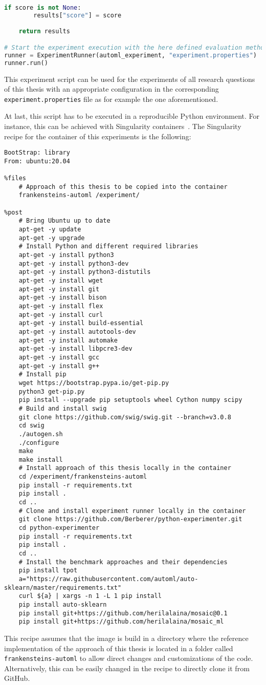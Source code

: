 \begin{lstlisting}[language=Python,basicstyle=\scriptsize]
    if score is not None:
        results["score"] = score

    return results

# Start the experiment execution with the here defined evaluation method
runner = ExperimentRunner(automl_experiment, "experiment.properties")
runner.run()
\end{lstlisting}
This experiment script can be used for the experiments of all research questions of this thesis with an appropriate configuration in the corresponding \texttt{experiment.properties} file as for example the one aforementioned.

At last, this script has to be executed in a reproducible Python environment.
For instance, this can be achieved with Singularity containers~\cite{Kurtzer-Singularity}.
The Singularity recipe for the container of this experiments is the following:
\begin{Verbatim}[fontsize=\scriptsize]
BootStrap: library
From: ubuntu:20.04

%files
    # Approach of this thesis to be copied into the container
    frankensteins-automl /experiment/

%post
    # Bring Ubuntu up to date
    apt-get -y update
    apt-get -y upgrade
    # Install Python and different required libraries
    apt-get -y install python3
    apt-get -y install python3-dev
    apt-get -y install python3-distutils
    apt-get -y install wget
    apt-get -y install git
    apt-get -y install bison
    apt-get -y install flex
    apt-get -y install curl
    apt-get -y install build-essential
    apt-get -y install autotools-dev
    apt-get -y install automake
    apt-get -y install libpcre3-dev
    apt-get -y install gcc
    apt-get -y install g++
    # Install pip
    wget https://bootstrap.pypa.io/get-pip.py
    python3 get-pip.py
    pip install --upgrade pip setuptools wheel Cython numpy scipy
    # Build and install swig
    git clone https://github.com/swig/swig.git --branch=v3.0.8
    cd swig
    ./autogen.sh
    ./configure
    make
    make install
    # Install approach of this thesis locally in the container
    cd /experiment/frankensteins-automl
    pip install -r requirements.txt
    pip install .
    cd ..
    # Clone and install experiment runner locally in the container
    git clone https://github.com/Berberer/python-experimenter.git
    cd python-experimenter
    pip install -r requirements.txt
    pip install .
    cd ..
    # Install the benchmark approaches and their dependencies
    pip install tpot
    a="https://raw.githubusercontent.com/automl/auto-sklearn/master/requirements.txt"
    curl ${a} | xargs -n 1 -L 1 pip install
    pip install auto-sklearn
    pip install git+https://github.com/herilalaina/mosaic@0.1
    pip install git+https://github.com/herilalaina/mosaic_ml
\end{Verbatim}
This recipe assumes that the image is build in a directory where the reference implementation of the approach of this thesis is located in a folder called \texttt{frankensteins-automl} to allow direct changes and customizations of the code.
Alternatively, this can be easily changed in the recipe to directly clone it from GitHub.

